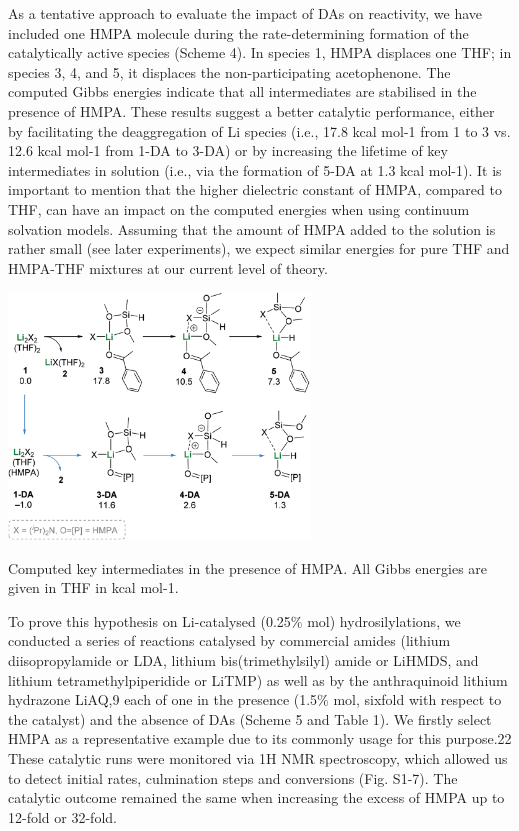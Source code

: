 \documentclass[journal=jacsat,manuscript=article]{achemso}
\begin{document}
	As a tentative approach to evaluate the impact of DAs on	reactivity, we have included one HMPA molecule during the
	rate-determining formation of the catalytically active species (Scheme 4). In species 1, HMPA displaces one THF; in species
	3, 4, and 5, it displaces the non-participating acetophenone. The computed Gibbs energies indicate that all intermediates
	are stabilised in the presence of HMPA. These results suggest a	better catalytic performance, either by facilitating the deaggregation of Li species (i.e., 17.8 kcal mol-1 from 1 to 3 vs. 12.6 kcal mol-1 from 1-DA to 3-DA) or by increasing the lifetime of key intermediates in solution (i.e., via the formation of 5-DA at 1.3 kcal mol-1). It is important to mention that the higher dielectric constant of HMPA, compared to THF, can have an impact on the computed energies when using continuum solvation models. Assuming that the amount of HMPA added to the solution is rather small (see later experiments),
	we expect similar energies for pure THF and HMPA-THF mixtures at our current level of theory.
	
	\begin{scheme}[H]
		\includegraphics[width=0.6\textwidth]{figures/CompHMPA.PNG}		
		\centering
		\caption{Computed key intermediates in the presence of HMPA. All Gibbs energies are given in THF in kcal mol-1.}
		\label{Scheme4}
	\end{scheme}
	
	To prove this hypothesis on Li-catalysed (0.25\% mol) hydrosilylations, we conducted a series of reactions catalysed by
	commercial amides (lithium diisopropylamide or LDA, lithium bis(trimethylsilyl) amide or LiHMDS, and lithium tetramethylpiperidide or LiTMP) as well as by the anthraquinoid lithium	hydrazone LiAQ,9 each of one in the presence (1.5\% mol, sixfold with respect to the catalyst) and the absence of DAs (Scheme 5 and Table 1). We firstly select HMPA as a representative example due to its commonly usage for this purpose.22 These catalytic runs were monitored via 1H NMR spectroscopy, which allowed us to detect initial rates, culmination steps and conversions (Fig. S1-7). The catalytic outcome remained the same when increasing the excess of HMPA up to 12-fold or 32-fold.
	
\end{document}
